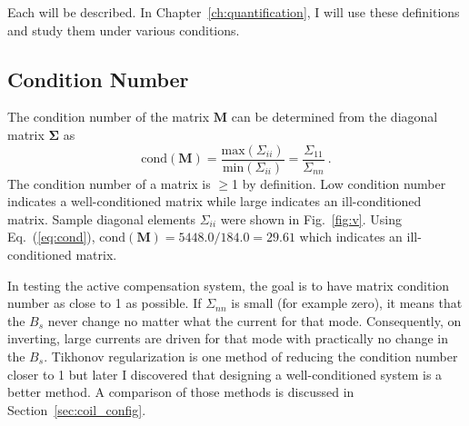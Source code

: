 Each will be described. In Chapter~\ref{ch:quantification}, I will use these definitions and study them under various conditions.

\subsection{Condition Number}


The condition number of the matrix $\bm{M}$ can be determined from the diagonal matrix $\bm{\Sigma}$ as 
 \begin{equation}\label{eq:cond}
     \mathrm{cond}(\bm{M})=\frac{\mathrm{max}(\Sigma_{ii})}{\mathrm{min}(\Sigma_{ii})}=\frac{\Sigma_{11}}{\Sigma_{nn}}~\text{.}
 \end{equation}
The condition number of a matrix is $\geq$1 by definition. Low condition number indicates a well-conditioned matrix while large indicates an ill-conditioned matrix. Sample diagonal elements $\Sigma_{ii}$ were shown in Fig.~\ref{fig:v}. Using Eq.~(\ref{eq:cond}),  $\mathrm{cond}(\bm{M})=5448.0/184.0=29.61$ which indicates an ill-conditioned matrix. 


In testing the active compensation system, the goal is to have matrix condition number as close to 1 as possible. If $\Sigma_{nn}$ is small (for example zero), it means that the $B_s$ never change no matter what the current for that mode. Consequently, on inverting, large currents are driven for that mode with practically no change in the $B_s$. Tikhonov regularization is one method of reducing the condition number closer to 1 but later I discovered that designing a well-conditioned system is a better method. A comparison of those methods is discussed in Section~\ref{sec:coil_config}.

